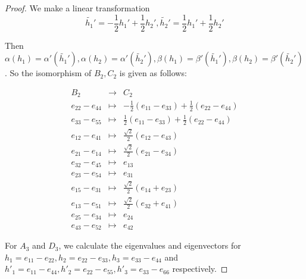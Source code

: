 \begin{proof}
  We make a linear transformation
  \begin{equation*}
    \tilde{h_1}'=-\frac{1}{2}h_1'+\frac{1}{2}h_2' , \tilde{h_2}'=\frac{1}{2}h_1'+\frac{1}{2}h_2'
  \end{equation*}

  Then $\alpha(h_1) = \alpha'(\tilde{h_1}'), \alpha(h_2) = \alpha'(\tilde{h_2}'), \beta(h_1) = \beta'(\tilde{h_1}'), \beta(h_2) = \beta'(\tilde{h_2}')$. So the isomorphism of $B_2,C_2$ is given as follows:

  \begin{equation*}
    \begin{array}{ccc}
      B_2 & \to & C_2 \\
      e_{22} - e_{44} &\mapsto& -\frac{1}{2}(e_{11} - e_{33}) + \frac{1}{2} (e_{22} - e_{44}) \\
      e_{33} - e_{55} &\mapsto& \frac{1}{2}(e_{11} - e_{33}) + \frac{1}{2}(e_{22} - e_{44}) \\
      e_{12} - e_{41} &\mapsto& \frac{\sqrt{2}}{2}(e_{12} - e_{43}) \\
      e_{21} - e_{14} &\mapsto& \frac{\sqrt{2}}{2}(e_{21} - e_{34}) \\
      e_{32} - e_{45} &\mapsto& e_{13} \\
      e_{23} - e_{54} &\mapsto& e_{31} \\
      e_{15} - e_{31} &\mapsto& \frac{\sqrt{2}}{2}(e_{14} + e_{23}) \\
      e_{13} - e_{51} &\mapsto& \frac{\sqrt{2}}{2}(e_{32} + e_{41}) \\
      e_{25} - e_{34} &\mapsto& e_{24} \\
      e_{43} - e_{52} &\mapsto& e_{42}
    \end{array}
  \end{equation*}

  For $A_3$ and $D_3$, we calculate the eigenvalues and eigenvectors for $h_1 = e_{11} - e_{22}, h_2 = e_{22} - e_{33}, h_3 = e_{33} - e_{44}$ and $h'_1 = e_{11} - e_{44}, h'_2 = e_{22} - e_{55}, h'_3 = e_{33} - e_{66}$ respectively.


\end{proof}
